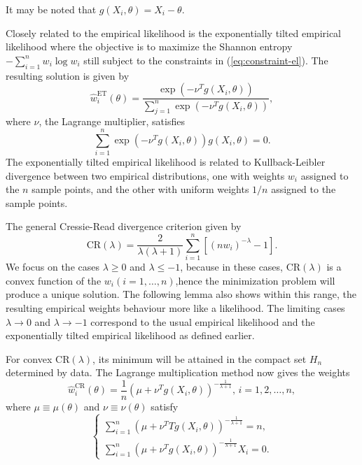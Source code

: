 \documentclass[oneside,english]{amsbook}
\numberwithin{section}{chapter}
\numberwithin{equation}{section}
\numberwithin{figure}{section}
\theoremstyle{plain}
\theoremstyle{plain}
\theoremstyle{definition}
\theoremstyle{plain}
\theoremstyle{plain}
\theoremstyle{remark}
\theoremstyle{definition}
\theoremstyle{definition}
\begin{document}
It may be noted that \citet{fang2005expected,fang2006empirical} $g\left(X_{i},\theta\right)=X_{i}-\theta$. 

Closely related to the empirical likelihood is the exponentially tilted
empirical likelihood where the objective is to maximize the Shannon
entropy $-\sum_{i=1}^{n}w_{i}\log w_{i}$ still subject to the constraints
in (\ref{eq:constraint-el}). The resulting solution is given by 
\begin{equation}
\hat{w}_{i}^{\mathrm{ET}}\left(\theta\right)=\frac{\exp\left(-\nu^{T}g\left(X_{i},\theta\right)\right)}{\sum_{j=1}^{n}\exp\left(-\nu^{T}g\left(X_{i},\theta\right)\right)},\label{eq:sol-weight-etel}
\end{equation}
where $\nu$, the Lagrange multiplier, satisfies 
\begin{equation}
\sum_{i=1}^{n}\exp\left(-\nu^{T}g\left(X_{i},\theta\right)\right)g\left(X_{i},\theta\right)=0.\label{eq:lag-mul-exp-tilt-el}
\end{equation}
The exponentially tilted empirical likelihood is related to Kullback-Leibler
divergence between two empirical distributions, one with weights $w_{i}$
assigned to the $n$ sample points, and the other with uniform weights
$1/n$ assigned to the sample points. 

The general Cressie-Read divergence criterion given by 
\[
\mathrm{CR}\left(\lambda\right)=\frac{2}{\lambda\left(\lambda+1\right)}\sum_{i=1}^{n}\left[\left(nw_{i}\right)^{-\lambda}-1\right].
\]
We focus on the cases $\lambda\ge0$ and $\lambda\le-1$, because
in these cases, $\mathrm{CR}\left(\lambda\right)$ is a convex function
of the $w_{i}\left(i=1,\ldots,n\right)$,hence the minimization
problem will produce a unique solution. The following lemma also shows
within this range, the resulting empirical weights behaviour more
like a likelihood. The limiting cases $\lambda\rightarrow0$ and $\lambda\rightarrow-1$
correspond to the usual empirical likelihood and the exponentially
tilted empirical likelihood as defined earlier. 

For convex $\mathrm{CR}\left(\lambda\right)$, its minimum will be
attained in the compact set $H_{n}$ determined by data. The Lagrange
multiplication method now gives the weights 
\begin{equation}
\hat{w}_{i}^{\mathrm{CR}}\left(\theta\right)=\frac{1}{n}\left(\mu+\nu^{T}g\left(X_{i},\theta\right)\right)^{-\frac{1}{\lambda+1}},\, i=1,2,\ldots,n,\label{eq:weight-cr-el}
\end{equation}
where $\mu\equiv\mu\left(\theta\right)$ and $\nu\equiv\nu\left(\theta\right)$
satisfy 
\begin{equation}
\begin{cases}
\sum_{i=1}^{n}\left(\mu+\nu^{T}Tg\left(X_{i},\theta\right)\right)^{-\frac{1}{\lambda+1}}=n,\\
\sum_{i=1}^{n}\left(\mu+\nu^{T}g\left(X_{i},\theta\right)\right)^{-\frac{1}{\lambda+1}}X_{i}=0.
\end{cases}\label{eq:lag-mul-cr-el}
\end{equation}
\end{document}
